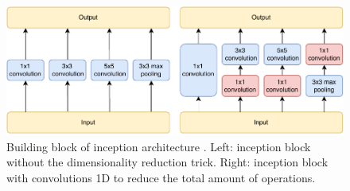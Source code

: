  \begin{figure}[hbt]
 
  \includegraphics[width=1.0\linewidth]{./distillation/images/inception.pdf}
  \caption[Inception architecture building block]{Building block of inception architecture \autocite{szegedy2015}. Left: inception block without the dimensionality reduction trick. Right: inception block with convolutions 1D to reduce the total amount of operations.}
  \label{fig:inception}
\end{figure}


